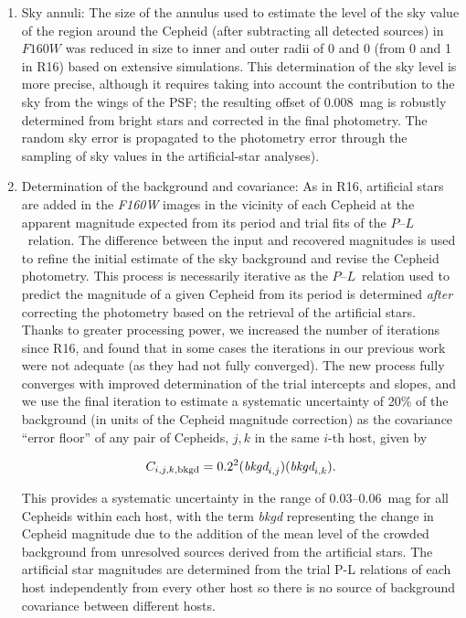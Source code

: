 \documentclass[12pt]{aastex631}
\newcommand{\bq}{\begin{equation}}
\newcommand{\eq}{\end{equation}}
\newcommand{\PLs}{$P$--$L$\ }
\begin{document}
\begin{enumerate}
\item Sky annuli: The size of the annulus used to estimate the level of the sky value of the region around the Cepheid (after subtracting all detected sources) in $F160W$ was reduced in size to inner and outer radii of 0 and 0 (from 0 and 1 in R16) based on extensive simulations.  This determination of the sky level is more precise, although it requires taking into account the contribution to the sky from the wings of the PSF; the resulting offset of  0.008~mag is robustly determined from bright stars and corrected in the final photometry.  The random sky error is propagated to the photometry error through the sampling of sky values in the artificial-star analyses).

\item Determination of the background and covariance: As in R16, artificial stars are added  in the {\it F160W} images in the vicinity of each Cepheid at the apparent magnitude expected from its period and trial fits of the \PLs relation. The difference between the input and recovered magnitudes is used to refine the initial estimate of the sky background and revise the Cepheid photometry.  This process is necessarily iterative as the \PLs relation used to predict the magnitude of a given Cepheid from its period is determined {\it after} correcting the photometry based on the retrieval of the artificial stars. Thanks to greater processing power, we increased the number of iterations since R16, and found that in some cases the iterations in our previous work were not adequate (as they had not fully converged). The new process fully converges with improved determination of the trial intercepts and slopes, and we use the final iteration to estimate a systematic uncertainty of 20\% of the background (in units of the Cepheid magnitude correction) as the covariance ``error floor'' of any pair of Cepheids, $j,k$ in the same $i$-th host, given by 

\bq C_{i,j,k,{\rm bkgd}}=0.2^2(\textit{bkgd}_{i,j})(\textit{bkgd}_{i,k}) . \label{eq:coverr} \eq 

This provides a systematic uncertainty in the range of 0.03--0.06~mag for all Cepheids within each host, with the term {\it bkgd} representing the change in Cepheid magnitude due to the addition of the mean level of the crowded background from unresolved sources derived from the artificial stars.   The artificial star magnitudes are determined from the trial P-L relations of each host independently from every other host so there is no source of background covariance between different hosts.


\end{enumerate}
\end{document}
